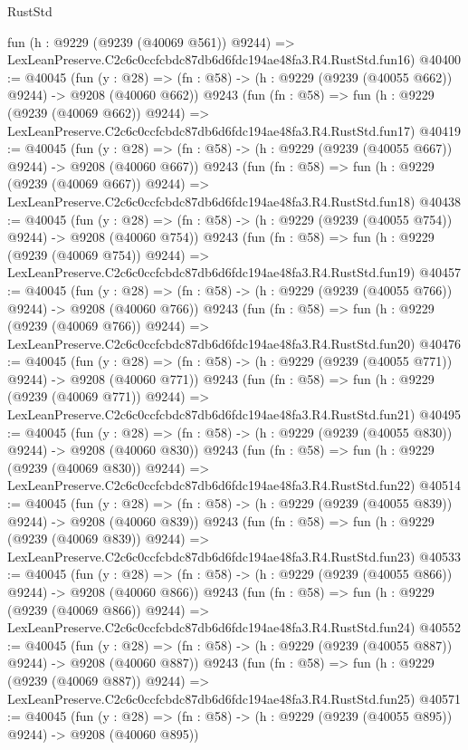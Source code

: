 \begin{lexlean}{RustStd}
\begin{coremodule}
    fun (h : @9229 (@9239 (@40069 @561)) @9244) =>
    LexLeanPreserve.C2c6c0ccfcbdc87db6d6fdc194ae48fa3.R4.RustStd.fun16)
@40400 := @40045
    (fun (y : @28) => (fn : @58) -> (h : @9229 (@9239 (@40055 @662)) @9244) -> @9208 (@40060 @662))
    @9243
    (fun (fn : @58) =>
    fun (h : @9229 (@9239 (@40069 @662)) @9244) =>
    LexLeanPreserve.C2c6c0ccfcbdc87db6d6fdc194ae48fa3.R4.RustStd.fun17)
@40419 := @40045
    (fun (y : @28) => (fn : @58) -> (h : @9229 (@9239 (@40055 @667)) @9244) -> @9208 (@40060 @667))
    @9243
    (fun (fn : @58) =>
    fun (h : @9229 (@9239 (@40069 @667)) @9244) =>
    LexLeanPreserve.C2c6c0ccfcbdc87db6d6fdc194ae48fa3.R4.RustStd.fun18)
@40438 := @40045
    (fun (y : @28) => (fn : @58) -> (h : @9229 (@9239 (@40055 @754)) @9244) -> @9208 (@40060 @754))
    @9243
    (fun (fn : @58) =>
    fun (h : @9229 (@9239 (@40069 @754)) @9244) =>
    LexLeanPreserve.C2c6c0ccfcbdc87db6d6fdc194ae48fa3.R4.RustStd.fun19)
@40457 := @40045
    (fun (y : @28) => (fn : @58) -> (h : @9229 (@9239 (@40055 @766)) @9244) -> @9208 (@40060 @766))
    @9243
    (fun (fn : @58) =>
    fun (h : @9229 (@9239 (@40069 @766)) @9244) =>
    LexLeanPreserve.C2c6c0ccfcbdc87db6d6fdc194ae48fa3.R4.RustStd.fun20)
@40476 := @40045
    (fun (y : @28) => (fn : @58) -> (h : @9229 (@9239 (@40055 @771)) @9244) -> @9208 (@40060 @771))
    @9243
    (fun (fn : @58) =>
    fun (h : @9229 (@9239 (@40069 @771)) @9244) =>
    LexLeanPreserve.C2c6c0ccfcbdc87db6d6fdc194ae48fa3.R4.RustStd.fun21)
@40495 := @40045
    (fun (y : @28) => (fn : @58) -> (h : @9229 (@9239 (@40055 @830)) @9244) -> @9208 (@40060 @830))
    @9243
    (fun (fn : @58) =>
    fun (h : @9229 (@9239 (@40069 @830)) @9244) =>
    LexLeanPreserve.C2c6c0ccfcbdc87db6d6fdc194ae48fa3.R4.RustStd.fun22)
@40514 := @40045
    (fun (y : @28) => (fn : @58) -> (h : @9229 (@9239 (@40055 @839)) @9244) -> @9208 (@40060 @839))
    @9243
    (fun (fn : @58) =>
    fun (h : @9229 (@9239 (@40069 @839)) @9244) =>
    LexLeanPreserve.C2c6c0ccfcbdc87db6d6fdc194ae48fa3.R4.RustStd.fun23)
@40533 := @40045
    (fun (y : @28) => (fn : @58) -> (h : @9229 (@9239 (@40055 @866)) @9244) -> @9208 (@40060 @866))
    @9243
    (fun (fn : @58) =>
    fun (h : @9229 (@9239 (@40069 @866)) @9244) =>
    LexLeanPreserve.C2c6c0ccfcbdc87db6d6fdc194ae48fa3.R4.RustStd.fun24)
@40552 := @40045
    (fun (y : @28) => (fn : @58) -> (h : @9229 (@9239 (@40055 @887)) @9244) -> @9208 (@40060 @887))
    @9243
    (fun (fn : @58) =>
    fun (h : @9229 (@9239 (@40069 @887)) @9244) =>
    LexLeanPreserve.C2c6c0ccfcbdc87db6d6fdc194ae48fa3.R4.RustStd.fun25)
@40571 := @40045
    (fun (y : @28) => (fn : @58) -> (h : @9229 (@9239 (@40055 @895)) @9244) -> @9208 (@40060 @895))

\end{coremodule}
\end{lexlean}
